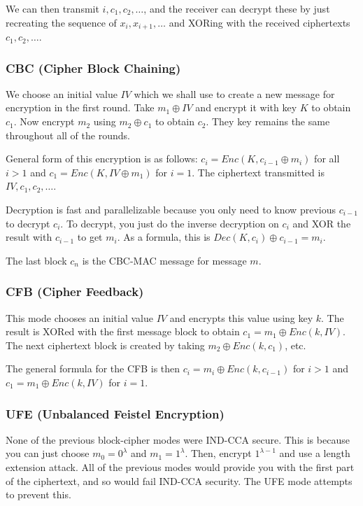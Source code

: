 \documentclass[psamsfonts]{amsart}
\begin{document}
We can then transmit $i, c_1, c_2, \ldots$, and the receiver can decrypt these by just recreating the sequence of $x_i, x_{i+1}, \ldots$ and XORing with the received ciphertexts $c_1, c_2, \ldots$.

\subsubsection{CBC (Cipher Block Chaining)}

We choose an initial value $IV$ which we shall use to create a new message for encryption in the first round. Take $m_1 \oplus IV$ and encrypt it with key $K$ to obtain $c_1$. Now encrypt $m_2$ using $m_2 \oplus c_1$ to obtain $c_2$. They key remains the same throughout all of the rounds.

General form of this encryption is as follows: $c_i = Enc(K, c_{i-1} \oplus m_i)$ for all $i > 1$ and $c_1 = Enc(K, IV \oplus m_1)$ for $i = 1$. The ciphertext transmitted is $IV, c_1, c_2, \ldots$.

Decryption is fast and parallelizable because you only need to know previous $c_{i-1}$ to decrypt $c_i$. To decrypt, you just do the inverse decryption on $c_i$ and XOR the result with $c_{i-1}$ to get $m_i$. As a formula, this is $Dec(K, c_{i}) \oplus c_{i-1} = m_i$.

The last block $c_n$ is the CBC-MAC message for message $m$.

\subsubsection{CFB (Cipher Feedback)}

This mode chooses an initial value $IV$ and encrypts this value using key $k$. The result is XORed with the first message block to obtain $c_1 = m_1 \oplus Enc(k, IV)$. The next ciphertext block is created by taking $m_2 \oplus Enc(k, c_1)$, etc.

The general formula for the CFB is then $c_i = m_i \oplus Enc(k, c_{i-1})$ for $i > 1$ and $c_1 = m_1 \oplus Enc(k, IV)$ for $i=1$.

\subsubsection{UFE (Unbalanced Feistel Encryption)}

None of the previous block-cipher modes were IND-CCA secure. This is because you can just choose $m_0 = 0^{\lambda}$ and $m_1 = 1^{\lambda}$. Then, encrypt $1^{\lambda-1}$ and use a length extension attack. All of the previous modes would provide you with the first part of the ciphertext, and so would fail IND-CCA security. The UFE mode attempts to prevent this.
\end{document}
